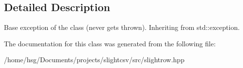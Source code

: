 \subsection{Detailed Description}
Base exception of the class (never gets thrown). Inheriting from std\+::exception. 

The documentation for this class was generated from the following file\+:\begin{DoxyCompactItemize}
\item 
/home/hsg/\+Documents/projects/slightcsv/src/slightrow.\+hpp\end{DoxyCompactItemize}
